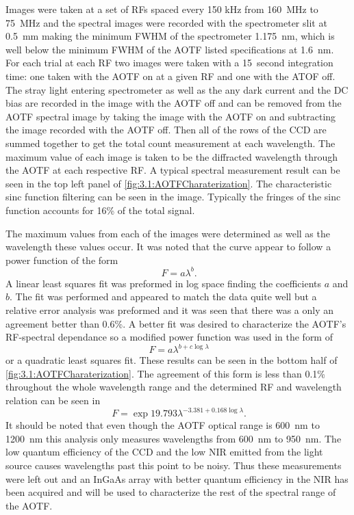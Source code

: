 \documentclass[12pt, draft]{article}
\begin{document}
Images were taken at a set of RFs spaced every 150 kHz from 160~MHz to 75~MHz and the spectral images were recorded with the spectrometer slit at 0.5~mm making the minimum FWHM of the spectrometer 1.175~nm, which is well below the minimum FWHM of the AOTF listed specifications at 1.6~nm. For each trial at each RF two images were taken with a 15~second integration time: one taken with the AOTF on at a given RF and one with the ATOF off. The stray light entering spectrometer as well as the any dark current and the DC bias are recorded in the image with the AOTF off and can be removed from the AOTF spectral image by taking the image with the AOTF on and subtracting the image recorded with the AOTF off. Then all of the rows of the CCD are summed together to get the total count measurement at each wavelength. The maximum value of each image is taken to be the diffracted wavelength through the AOTF at each respective RF. A typical spectral measurement result can be seen in the top left panel of \autoref{fig:3.1:AOTFCharaterization}. The characteristic sinc function filtering can be seen in the image. Typically the fringes of the sinc function accounts for 16\% of the total signal.

The maximum values from each of the images were determined as well as the wavelength these values occur. It was noted that the curve appear to follow a power function of the form
\begin{equation}
    \ F = a\lambda^{b}.
    \label{eqn:3.1:powerFunction}
\end{equation}
A linear least squares fit was preformed in log space finding the coefficients $a$ and $b$. The fit was performed and appeared to match the data quite well but a relative error analysis was preformed and it was seen that there was a only an agreement better than 0.6\%. A better fit was desired to characterize the AOTF's RF-spectral dependance so a modified power function was used in the form of
 \begin{equation}
    \ F = a\lambda^{b+c\log\lambda}
    \label{eqn:3.1:modifiedPowerFunction}
\end{equation}
or a quadratic least squares fit. These results can be seen in the bottom half of \autoref{fig:3.1:AOTFCharaterization}. The agreement of this form is less than 0.1\% throughout the whole wavelength range and the determined RF and wavelength relation can be seen in
\begin{equation}
    \ F = \exp{19.793}\lambda^{-3.381+0.168\log\lambda}.
    \label{eqn:3.1:modifiedPowerFunctionCoeffiecicents}
\end{equation}
It should be noted that even though the AOTF optical range is 600~nm to 1200~nm this analysis only measures wavelengths from 600~nm to 950~nm. The low quantum efficiency of the CCD and the low NIR emitted from the light source causes wavelengths past this point to be noisy. Thus these measurements were left out and an InGaAs array with better quantum efficiency in the NIR has been acquired and will be used to characterize the rest of the spectral range of the AOTF.
\end{document}
